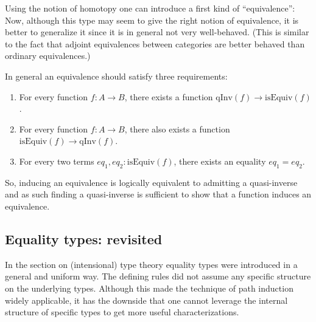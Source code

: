     Using the notion of homotopy one can introduce a first kind of ``equivalence'':
    Now, although this type may seem to give the right notion of equivalence, it is better to generalize it since it is in general not very well-behaved. (This is similar to the fact that adjoint equivalences between categories are better behaved than ordinary equivalences.)

    In general an equivalence should satisfy three requirements:
    \begin{enumerate}
        \item For every function $f:A\rightarrow B$, there exists a function $\text{qInv}(f)\rightarrow\text{isEquiv}(f)$.
        \item For every function $f:A\rightarrow B$, there also exists a function $\text{isEquiv}(f)\rightarrow\text{qInv}(f)$.
        \item For every two terms $eq_1,eq_2:\text{isEquiv}(f)$, there exists an equality $eq_1=eq_2$.
    \end{enumerate}
    So, inducing an equivalence is logically equivalent to admitting a quasi-inverse and as such finding a quasi-inverse is sufficient to show that a function induces an equivalence.

\subsection{Equality types: revisited}

    In the section on (intensional) type theory equality types were introduced in a general and uniform way. The defining rules did not assume any specific structure on the underlying types. Although this made the technique of path induction widely applicable, it has the downside that one cannot leverage the internal structure of specific types to get more useful characterizations.

